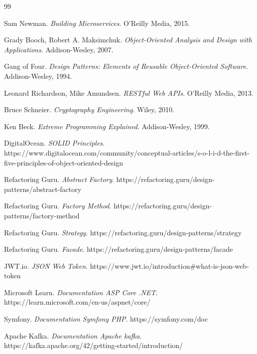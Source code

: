 \documentclass[12pt,a4paper]{report}
\begin{document}
	\newpage

	\begin{thebibliography}{99}
		
		 Sam Newman. \textit{Building Microservices}. O'Reilly Media, 2015.
		
		 Grady Booch, Robert A. Maksimchuk. \textit{Object-Oriented Analysis and Design with Applications}. Addison-Wesley, 2007.
		
		 Gang of Four. \textit{Design Patterns: Elements of Reusable Object-Oriented Software}. Addison-Wesley, 1994.
		
		 Leonard Richardson, Mike Amundsen. \textit{RESTful Web APIs}. O'Reilly Media, 2013.
		
		 Bruce Schneier. \textit{Cryptography Engineering}. Wiley, 2010.
		
		 Ken Beck. \textit{Extreme Programming Explained}. Addison-Wesley, 1999.
		
		 DigitalOcean. \textit{SOLID Principles}. https://www.digitalocean.com/community/conceptual-articles/s-o-l-i-d-the-first-five-principles-of-object-oriented-design
		
		 Refactoring Guru. \textit{Abstract Factory}. https://refactoring.guru/design-patterns/abstract-factory
		
		 Refactoring Guru. \textit{Factory Method}. https://refactoring.guru/design-patterns/factory-method
		
		 Refactoring Guru. \textit{Strategy}. https://refactoring.guru/design-patterns/strategy
		
		 Refactoring Guru. \textit{Facade}. https://refactoring.guru/design-patterns/facade
		
		 JWT.io. \textit{JSON Web Token}. https://www.jwt.io/introduction\#what-is-json-web-token
		
		 Microsoft Learn. \textit{Documentation ASP Core .NET}. https://learn.microsoft.com/en-us/aspnet/core/
		
		 Symfony. \textit{Documentation Symfony PHP}. https://symfony.com/doc
		
		 Apache Kafka. \textit{Documentation Apache kafka}. https://kafka.apache.org/42/getting-started/introduction/
		

\end{thebibliography}
\end{document}
